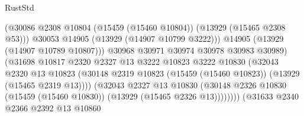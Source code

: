 \begin{lexlean}{RustStd}
\begin{coremodule}
                                              (@30086
                                                @2308
                                                @10804
                                                (@15459 (@15460 @10804))
                                                (@13929 (@15465 @2308 @53)))
                                              @30053
                                              @14905
                                              (@13929 (@14907 @10799 @3222)))
                                            @14905
                                            (@13929 (@14907 @10789 @10807)))
                                          @30968
                                          @30971
                                          @30974
                                          @30978
                                          @30983
                                          @30989)
                                        (@31698
                                          @10817
                                          @2320
                                          @2327
                                          @13
                                          @3222
                                          @10823
                                          @3222
                                          @10830
                                          (@32043
                                            @2320
                                            @13
                                            @10823
                                            (@30148
                                              @2319
                                              @10823
                                              (@15459 (@15460 @10823))
                                              (@13929 (@15465 @2319 @13))))
                                          (@32043
                                            @2327
                                            @13
                                            @10830
                                            (@30148
                                              @2326
                                              @10830
                                              (@15459 (@15460 @10830))
                                              (@13929 (@15465 @2326 @13))))))))
                                  (@31633
                                    @2340
                                    @2366
                                    @2392
                                    @13
                                    @10860

\end{coremodule}
\end{lexlean}
